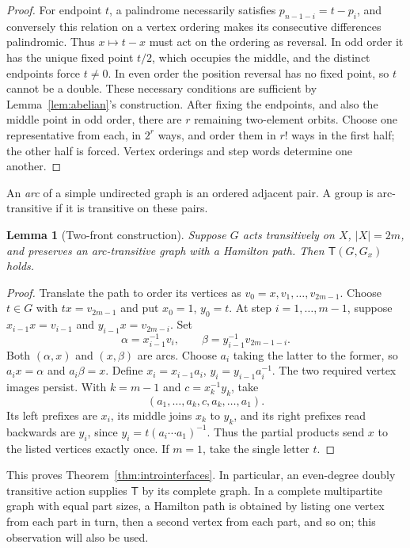 \documentclass[11pt]{article}
\newtheorem{lemma}[theorem]{Lemma}
\theoremstyle{definition}
\newcommand{\Tt}{\mathsf T}
\begin{document}
\begin{proof}
For endpoint $t$, a palindrome necessarily satisfies $p_{n-1-i}=t-p_i$, and conversely this relation on a vertex ordering makes its consecutive differences palindromic. Thus $x\mapsto t-x$ must act on the ordering as reversal. In odd order it has the unique fixed point $t/2$, which occupies the middle, and the distinct endpoints force $t\ne0$. In even order the position reversal has no fixed point, so $t$ cannot be a double. These necessary conditions are sufficient by Lemma~\ref{lem:abelian}'s construction. After fixing the endpoints, and also the middle point in odd order, there are $r$ remaining two-element orbits. Choose one representative from each, in $2^r$ ways, and order them in $r!$ ways in the first half; the other half is forced. Vertex orderings and step words determine one another.
\end{proof}

An \emph{arc} of a simple undirected graph is an ordered adjacent pair. A group is arc-transitive if it is transitive on these pairs.
\begin{lemma}[Two-front construction]\label{lem:twofront}
Suppose $G$ acts transitively on $X$, $|X|=2m$, and preserves an arc-transitive graph with a Hamilton path. Then $\Tt(G,G_x)$ holds.
\end{lemma}
\begin{proof}
Translate the path to order its vertices as $v_0=x,v_1,\ldots,v_{2m-1}$. Choose $t\in G$ with $tx=v_{2m-1}$ and put $x_0=1$, $y_0=t$. At step $i=1,\ldots,m-1$, suppose $x_{i-1}x=v_{i-1}$ and $y_{i-1}x=v_{2m-i}$. Set
\[
\alpha=x_{i-1}^{-1}v_i,\qquad \beta=y_{i-1}^{-1}v_{2m-1-i}.
\]
Both $(\alpha,x)$ and $(x,\beta)$ are arcs. Choose $a_i$ taking the latter to the former, so $a_ix=\alpha$ and $a_i\beta=x$. Define $x_i=x_{i-1}a_i$, $y_i=y_{i-1}a_i^{-1}$. The two required vertex images persist. With $k=m-1$ and $c=x_k^{-1}y_k$, take
\[
(a_1,\ldots,a_k,c,a_k,\ldots,a_1).
\]
Its left prefixes are $x_i$, its middle joins $x_k$ to $y_k$, and its right prefixes read backwards are $y_i$, since $y_i=t(a_i\cdots a_1)^{-1}$. Thus the partial products send $x$ to the listed vertices exactly once. If $m=1$, take the single letter $t$.
\end{proof}
This proves Theorem~\ref{thm:introinterfaces}. In particular, an even-degree doubly transitive action supplies $\Tt$ by its complete graph. In a complete multipartite graph with equal part sizes, a Hamilton path is obtained by listing one vertex from each part in turn, then a second vertex from each part, and so on; this observation will also be used.
\end{document}

